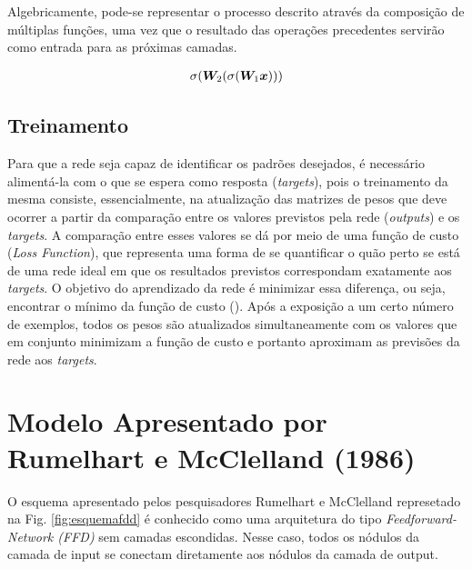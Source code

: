 
Algebricamente, pode-se representar o processo descrito através da composição de múltiplas funções, uma vez que o resultado das operações precedentes servirão como entrada para as próximas camadas.

\begin{align}
\sigma(\bm{W}_2 (\sigma(\bm{W}_1\bm{x})))
\end{align}



\subsection{Treinamento}

Para que a rede seja capaz de identificar os padrões desejados, é necessário alimentá-la com o que se espera como resposta (\textit{targets}), pois o treinamento da mesma consiste, essencialmente, na atualização das matrizes de pesos que deve ocorrer a partir da comparação entre os valores previstos pela rede (\textit{outputs}) e os \textit{targets}. A comparação entre esses valores se dá por meio de uma função de custo (\textit{Loss Function}), que representa uma forma de se quantificar o quão perto se está de uma rede ideal em que os resultados previstos correspondam exatamente aos \textit{targets}. O objetivo do aprendizado da rede é minimizar essa diferença, ou seja, encontrar o mínimo da função de custo (\cite{josh:2017}). Após a exposição a um certo número de exemplos, todos os pesos são atualizados simultaneamente com os valores que em conjunto minimizam a função de custo e portanto aproximam as previsões da rede aos \textit{targets}. %

\section{Modelo Apresentado por Rumelhart e McClelland (1986)}
\label{sec:arqFDD}

O esquema apresentado pelos pesquisadores Rumelhart e McClelland represetado na Fig. \ref{fig:esquemafdd} é conhecido como uma arquitetura do tipo \textit{Feedforward-Network (FFD)} sem camadas escondidas. Nesse caso, todos os nódulos da camada de input se conectam diretamente aos nódulos da camada de output.

